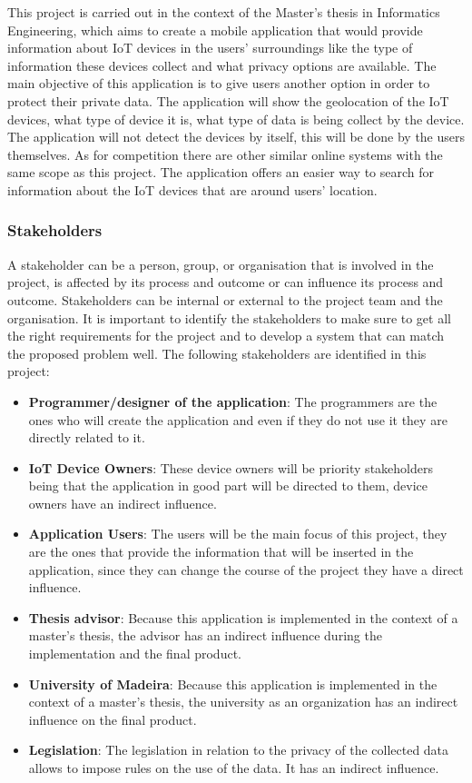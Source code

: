 This project is carried out in the context of the Master's thesis in Informatics
Engineering, which aims to create a mobile application that would provide
information about IoT devices in the users' surroundings like the type of information
these devices collect and what privacy options are available. The main objective
of this application is to give users another option in order to protect
their private data. The application will show the geolocation of the IoT
devices, what type of device it is, what type of data is being collect by
the device. The application will not detect the devices by itself, this will
be done by the users themselves. As for competition there are other similar
online systems with the same scope as this project. The application offers
an easier way to search for information about the IoT devices that are around users'
location.

\subsubsection*{Stakeholders}

A stakeholder can be a person, group, or organisation that is involved in
the project, is affected by its process and outcome or can influence its
process and outcome. Stakeholders can be internal or external to the project
team and the organisation.
\newline
It is important to identify the stakeholders to make sure to get all the
right requirements for the project and to develop a system that can match
the proposed problem well.
\newline
The following stakeholders are identified in this project:
\begin{itemize}
    \item \textbf{Programmer/designer of the application}: The programmers are the ones who will create the application and even if they do not use it they are directly related to it.
    \item \textbf{IoT Device Owners}: These device owners will be priority stakeholders being that the application in good part will be directed to them, device owners have an indirect influence.
    \item \textbf{Application Users}: The users will be the main focus of this project, they are the ones that provide the information that will be inserted in the application, since they can change the course of the project they have a direct influence.
    \item \textbf{Thesis advisor}: Because this application is implemented in the context of a master's thesis, the advisor has an indirect influence during the implementation and the final product.
    \item \textbf{University of Madeira}: Because this application is implemented in the context of a master's thesis, the university as an organization has an indirect influence on the final product.
    \item \textbf{Legislation}: The legislation in relation to the privacy of the collected data allows to impose rules on the use of the data. It has an indirect influence.
\end{itemize}

